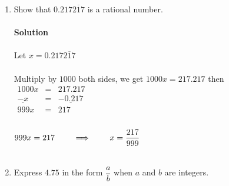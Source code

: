 \documentclass[11pt,a4paper]{article}
\begin{document}
\begin{enumerate}
$
\begin{matrix}
10x & = 38.3333\\
100x & = 383.33\\
\end{matrix} 
$\\\\  

$\implies
\begin{matrix}
100x & = & 383.33\\
\underline{-10x} & = & \underline{38.33}\\
90x & = & 345\\
\end{matrix}
$\\\\

$90x=345\hspace{0.7cm} \implies \hspace{0.7cm} x=\dfrac{345}{90}=\dfrac{23}{6}$\\\\

$\therefore \hspace{0.7cm} x=\dfrac{23}{6}$\\\\

\item Show that $0.217\overline{217}$ is a rational number.\\\\
\textbf{Solution}\\\\
Let $x=0.217\overline{217}$\\\\
Multiply by $1 000$ both sides, we get $1 000x = 217.217$ then\\

$
\begin{matrix}
1 000x & = & 217.217\\
\underline{-x} & = & \underline{-0.217}\\
999x & = & 217\\
\end{matrix} 
$\\\\

$999x=217\hspace{0.7cm} \implies \hspace{0.7cm} x=\dfrac{217}{999}$\\\\


\item Express $4.75$ in the form $\dfrac{a}{b}$ when $a$ and $b$ are integers.\\\\


\end{enumerate}
\end{document}
